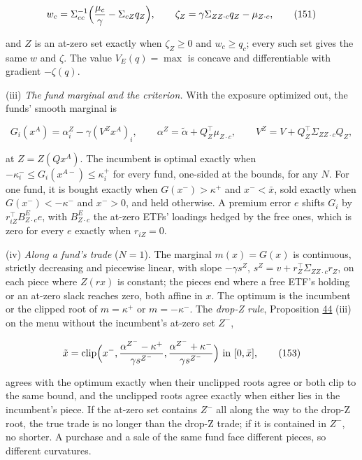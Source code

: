\documentclass[11pt]{article}
\begin{document}
\begin{equation*}
w_c=\Sigma_{cc}^{-1}\Bigl(\frac{\mu_c}\gamma-\Sigma_{cZ}q_Z\Bigr),\qquad
\zeta_Z=\gamma\Sigma_{ZZ\cdot c}q_Z-\mu_{Z\cdot c},\tag{151}\label{eq:151}
\end{equation*}

and \(Z\) is an at-zero set exactly when \(\zeta_Z\geq0\) and \(w_c\geq q_c\); every such
set gives the same \(w\) and \(\zeta\). The value \(V_E(q)=\max\) is concave and
differentiable with gradient \(-\zeta(q)\).

(iii) \emph{The fund marginal and the criterion.} With the exposure
optimized out, the funds' smooth marginal is

\begin{equation*}
G_i(x^A)=\alpha^Z_i-\gamma(V^Zx^A)_i,\qquad
\alpha^Z=\tilde\alpha+Q_Z^\top\mu_{Z\cdot c},\qquad V^Z=V+Q_Z^\top\Sigma_{ZZ\cdot c}Q_Z,\tag{152}\label{eq:152}
\end{equation*}

at \(Z=Z(Qx^A)\). The incumbent is optimal exactly when
\(-\kappa^-_i\leq G_i(x^{A-})\leq\kappa^+_i\) for every fund, one-sided at the bounds, for
any \(N\). For one fund, it is bought exactly when \(G(x^-)>\kappa^+\) and
\(x^-<\bar x\), sold exactly when \(G(x^-)<-\kappa^-\) and \(x^->0\), and held
otherwise. A premium error \(e\) shifts \(G_i\) by \(r_{iZ}^\top B^E_{Z\cdot c}e\), with
\(B^E_{Z\cdot c}\) the at-zero ETFs' loadings hedged by the free ones, which is zero
for every \(e\) exactly when \(r_{iZ}=0\).

(iv) \emph{Along a fund's trade} (\(N=1\)). The marginal \(m(x)=G(x)\) is
continuous, strictly decreasing and piecewise linear, with slope
\(-\gamma s^Z\), \(s^Z=v+r_Z^\top\Sigma_{ZZ\cdot c}r_Z\), on each piece where \(Z(rx)\) is constant;
the pieces end where a free ETF's holding or an at-zero slack reaches
zero, both affine in \(x\). The optimum is the incumbent or the clipped
root of \(m=\kappa^+\) or \(m=-\kappa^-\). The \emph{drop-Z rule}, Proposition \hyperref[res:Proposition-44]{44} (iii) on
the menu without the incumbent's at-zero set \(Z^-\),

\begin{equation*}
\tilde x=\mathrm{clip}\Bigl(x^-,\frac{\alpha^{Z^-}-\kappa^+}{\gamma s^{Z^-}},\frac{\alpha^{Z^-}+\kappa^-}{\gamma s^{Z^-}}\Bigr)\text{ in }[0,\bar x],\tag{153}\label{eq:153}
\end{equation*}

agrees with the optimum exactly when their unclipped roots agree or
both clip to the same bound, and the unclipped roots agree exactly
when either lies in the incumbent's piece. If the at-zero set contains
\(Z^-\) all along the way to the drop-Z root, the true trade is no longer
than the drop-Z trade; if it is contained in \(Z^-\), no shorter. A purchase and a sale of the same fund face
different pieces, so different curvatures.
\end{document}
